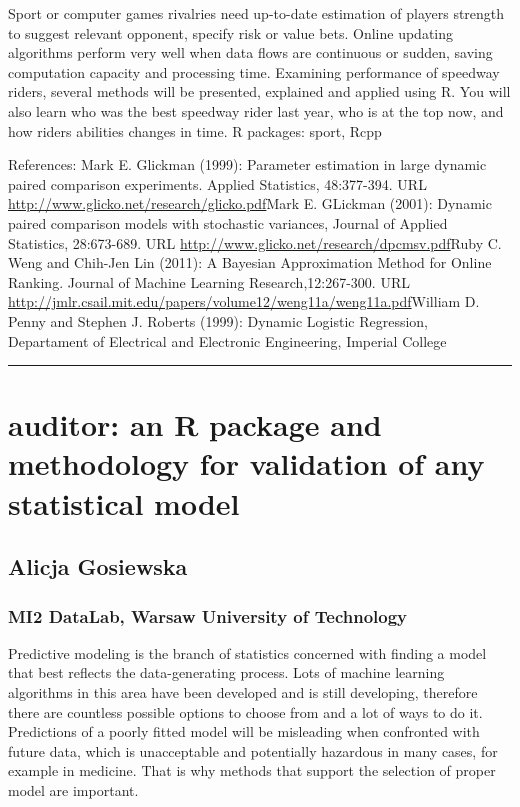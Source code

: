 \documentclass [12pt]{article}
\begin{document}
Sport or computer games rivalries need up-to-date estimation of players strength to suggest relevant opponent, specify risk or value bets. Online updating algorithms perform very well when data flows are continuous or sudden, saving computation capacity and processing time. Examining performance of speedway riders, several methods will be presented, explained and applied using R. You will also learn who was the best speedway rider last year, who is at the top now, and how riders abilities changes in time.\newline
R packages: sport, Rcpp

References: \newline
[]Mark E. Glickman (1999): Parameter estimation in large dynamic paired comparison experiments. Applied Statistics, 48:377-394. URL \url{http://www.glicko.net/research/glicko.pdf}\newline
[]Mark E. GLickman (2001): Dynamic paired comparison models with stochastic variances, Journal of Applied Statistics, 28:673-689. URL \url{http://www.glicko.net/research/dpcmsv.pdf}\newline
[]Ruby C. Weng and Chih-Jen Lin (2011): A Bayesian Approximation Method for Online Ranking. Journal of Machine Learning Research,12:267-300. URL \url{http://jmlr.csail.mit.edu/papers/volume12/weng11a/weng11a.pdf}\newline
[]William D. Penny and Stephen J. Roberts (1999): Dynamic Logistic Regression, Departament of Electrical and Electronic Engineering, Imperial College


\noindent\rule{\textwidth}{1pt}
\section{auditor: an R package and methodology for validation of any statistical model}
\subsection*{Alicja Gosiewska}
\subsubsection*{MI2 DataLab, Warsaw University of Technology}

Predictive modeling is the branch of statistics concerned with finding a model that best reflects the data-generating process. Lots of machine learning algorithms in this area have been developed and is still developing, therefore there are countless possible options to choose from and a lot of ways to do it. Predictions of a poorly fitted model will be misleading when confronted with future data, which is unacceptable and potentially hazardous in many cases, for example in medicine. That is why methods that support the selection of proper model are important.
\end{document}
